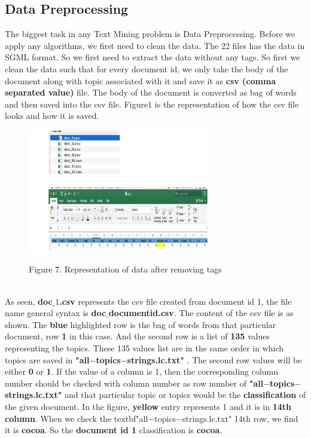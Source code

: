\documentclass[fleqn,10pt]{SelfArx} %
\begin{document}
\subsection{Data Preprocessing}
The biggest task in any Text Mining problem is Data Preprocessing. Before we apply any algorithms, we first need to clean the data.  The 22 files has the data in SGML format. So we first need to extract the data without any tags. So first we clean the data such that for every document id, we only take the body of the document along with topic associated  with it and save it as \textbf{csv (comma separated value)} file. The body of the document is converted as bag of words and then saved into the csv file.  Figure1 is the representation of how the csv file looks and how it is saved.
\begin{figure}[h]
\begin{minipage}[b]{1.0\linewidth}
  \centering
  \centerline{\includegraphics[width=8cm]{representation}}
  \centerline{Figure 7. Representation of data after removing tags}\medskip
\end{minipage}
\end{figure}
\\As seen, \textbf{doc$\_1$.csv} represents the csv file created from document id 1, the file name general syntax is \textbf{doc$\_$documentid.csv}. The content of the csv file is as shown. The \textbf{blue} highlighted row is the bag of words from that particular document, row \textbf{1} in this case. And the second row is a list of \textbf{135} values representing the topics. These 135 values list are in the same order in which topics are saved in \textbf{"all$-$topics$-$strings.lc.txt"} . The second row values will be either \textbf{0} or \textbf{1}. If the value of a column is 1, then the corresponding column number should be checked with column number as row number of \textbf{"all$-$topics$-$strings.lc.txt"} and that particular topic or topics would be the \textbf{classification} of the given document. In the figure, \textbf{yellow} entry represents 1 and it is in \textbf{14th column}. When we check the textbf{"all$-$topics$-$strings.lc.txt"} 14th row, we find it is \textbf{cocoa}. So the \textbf{document id 1} classification is \textbf{cocoa}.
\end{document}
